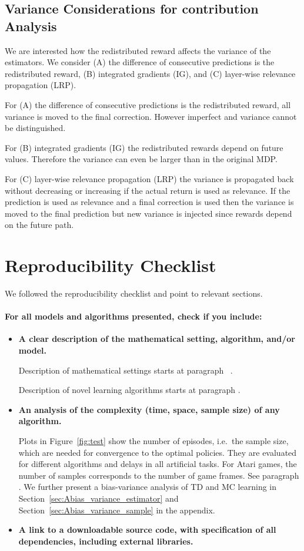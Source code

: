\documentclass{article}
\begin{document}
\begin{appendices}
\subsection{Variance Considerations for contribution Analysis}

We are interested how the redistributed reward affects the variance 
of the estimators. 
We consider
(A) the difference of consecutive predictions is the redistributed reward,
(B) integrated gradients (IG), and
(C) layer-wise relevance propagation (LRP).

For (A) the difference of consecutive predictions is the redistributed reward,
all variance is moved to the final correction. However imperfect  and variance
cannot be distinguished.

For (B) integrated gradients (IG) the redistributed rewards depend on future values.
Therefore the variance can even be larger than in the original MDP.

For (C) layer-wise relevance propagation (LRP) the variance is propagated back without
decreasing or increasing if the actual return is used as relevance. If the prediction is
used as relevance and a final correction is used then the variance is moved to the final
prediction but new variance is injected since rewards depend on the future path.



\clearpage
\pagebreak
\section{Reproducibility Checklist}
We followed the reproducibility checklist \cite{Pineau:18} and point to relevant sections. 
\paragraph{For all models and algorithms presented, check if you include:}
\begin{itemize}
    \item \textbf{A clear description of the mathematical setting, algorithm, and/or model.}
    
    Description of mathematical settings starts at paragraph ~.
    
    Description of novel learning algorithms starts at paragraph .
    \item \textbf{An analysis of the complexity (time, space, sample size) of any algorithm.}
    
    Plots in Figure~\ref{fig:test} show the number of episodes, i.e.\ the sample size, which are needed for convergence to the optimal policies. They are evaluated for different algorithms and delays in all artificial tasks.
    For Atari games, the number of samples corresponds to the number of game frames. See paragraph .
    We further present a bias-variance analysis of TD and MC learning in Section~\ref{sec:Abias_variance_estimator} and Section~\ref{sec:Abias_variance_sample} in the appendix.
\item \textbf{A link to a downloadable source code, with specification of all dependencies, including external libraries.}
    

\end{itemize}
\end{appendices}
\end{document}
